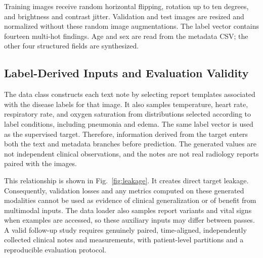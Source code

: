 \documentclass[conference]{IEEEtran}
\begin{document}
Training images receive random horizontal flipping, rotation up to ten degrees, and brightness and contrast jitter. Validation and test images are resized and normalized without these random image augmentations. The label vector contains fourteen multi-hot findings. Age and sex are read from the metadata CSV; the other four structured fields are synthesized.

\subsection{Label-Derived Inputs and Evaluation Validity}
The data class constructs each text note by selecting report templates associated with the disease labels for that image. It also samples temperature, heart rate, respiratory rate, and oxygen saturation from distributions selected according to label conditions, including pneumonia and edema. The same label vector is used as the supervised target. Therefore, information derived from the target enters both the text and metadata branches before prediction. The generated values are not independent clinical observations, and the notes are not real radiology reports paired with the images.

This relationship is shown in Fig.~\ref{fig:leakage}. It creates direct target leakage. Consequently, validation losses and any metrics computed on these generated modalities cannot be used as evidence of clinical generalization or of benefit from multimodal inputs. The data loader also samples report variants and vital signs when examples are accessed, so these auxiliary inputs may differ between passes. A valid follow-up study requires genuinely paired, time-aligned, independently collected clinical notes and measurements, with patient-level partitions and a reproducible evaluation protocol.
\end{document}

